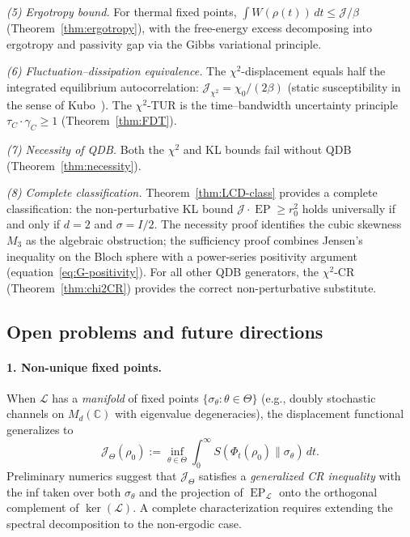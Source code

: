 \documentclass[11pt,a4paper]{article}
\theoremstyle{definition}
\theoremstyle{remark}
\DeclareMathOperator{\EP}{EP}
\newcommand{\C}{\mathbb{C}}
\newcommand{\LL}{\mathcal{L}}
\newcommand{\Jchi}{\mathcal{J}_{\chi^2}}
\begin{document}
\emph{(5) Ergotropy bound.}  For thermal fixed points,
$\int W(\rho(t))\,dt \le \mathcal{J}/\beta$
(Theorem~\ref{thm:ergotropy}), with the free-energy excess
decomposing into ergotropy and passivity gap
via the Gibbs variational principle.

\emph{(6) Fluctuation--dissipation equivalence.}
The $\chi^2$-displacement equals half the integrated equilibrium
autocorrelation: $\Jchi = \chi_0/(2\beta)$ (static susceptibility
in the sense of Kubo~\cite{Kubo1966}).  The $\chi^2$-TUR is the
time--bandwidth uncertainty principle $\tau_C\cdot\gamma_C \ge 1$
(Theorem~\ref{thm:FDT}).

\emph{(7) Necessity of QDB.}  Both the $\chi^2$ and KL bounds
fail without QDB (Theorem~\ref{thm:necessity}).

\emph{(8) Complete classification.}
Theorem~\ref{thm:LCD-class} provides a complete classification:
the non-perturbative KL bound
$\mathcal{J}\cdot\EP \ge r_0^2$ holds universally if and only if
$d = 2$ and $\sigma = I/2$.  The necessity proof identifies the
cubic skewness $M_3$ as the algebraic obstruction; the sufficiency
proof combines Jensen's inequality on the Bloch sphere with
a power-series positivity argument
(equation~\eqref{eq:G-positivity}).  For all other QDB generators,
the $\chi^2$-CR (Theorem~\ref{thm:chi2CR}) provides the correct
non-perturbative substitute.

\subsection{Open problems and future directions}

\paragraph{1. Non-unique fixed points.}
When $\LL$ has a \emph{manifold} of fixed points $\{\sigma_\theta : \theta \in \Theta\}$ 
(e.g., doubly stochastic channels on $M_d(\C)$ with eigenvalue degeneracies), 
the displacement functional generalizes to
\[
  \mathcal{J}_\Theta(\rho_0) := \inf_{\theta \in \Theta} 
  \int_0^\infty S(\Phi_t(\rho_0)\|\sigma_\theta)\,dt.
\]
Preliminary numerics suggest that $\mathcal{J}_\Theta$ satisfies a 
\emph{generalized CR inequality} with the inf taken over both $\sigma_\theta$ 
and the projection of $\EP_\LL$ onto the orthogonal complement of 
$\ker(\LL)$. A complete characterization requires extending the spectral 
decomposition to the non-ergodic case.
\end{document}
